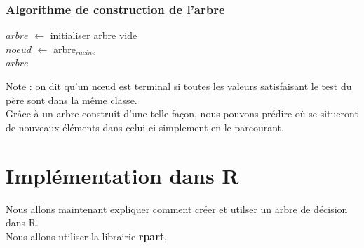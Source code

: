 \documentclass[compress]{beamer}
\begin{document}
\begin{frame}
\frametitle{Algorithme de construction de l'arbre}
\begin{algorithm}[H]


$arbre$ $\leftarrow$ initialiser arbre vide \\
$noeud$ $\leftarrow$ arbre$_{racine}$ \\
\Retour $arbre$
\BlankLine
\end{algorithm}
\end{frame}

\begin{frame}
Note : on dit qu'un nœud est terminal si toutes les valeurs satisfaisant le test du père sont dans la même classe.\\

Grâce à un arbre construit d'une telle façon, nous pouvons prédire où se situeront de nouveaux éléments dans celui-ci simplement en le parcourant.
\end{frame}

\section{Implémentation dans R}

\begin{frame}
Nous allons maintenant expliquer comment créer et utilser un arbre de décision dans R.\\

Nous allons utiliser la librairie \textbf{rpart}, 
\end{frame}
\end{document}
